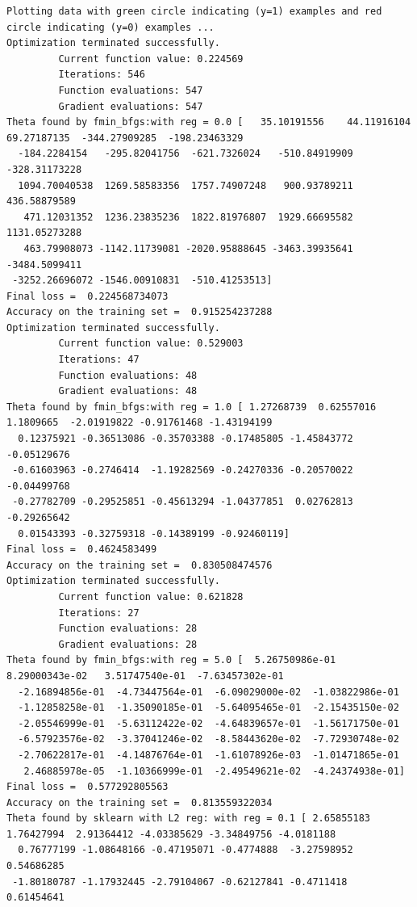 \documentclass{article}
\begin{document}
\begin{tiny}
\begin{lstlisting}
Plotting data with green circle indicating (y=1) examples and red circle indicating (y=0) examples ...
Optimization terminated successfully.
         Current function value: 0.224569
         Iterations: 546
         Function evaluations: 547
         Gradient evaluations: 547
Theta found by fmin_bfgs:with reg = 0.0 [   35.10191556    44.11916104    69.27187135  -344.27909285  -198.23463329
  -184.2284154   -295.82041756  -621.7326024   -510.84919909  -328.31173228
  1094.70040538  1269.58583356  1757.74907248   900.93789211   436.58879589
   471.12031352  1236.23835236  1822.81976807  1929.66695582  1131.05273288
   463.79908073 -1142.11739081 -2020.95888645 -3463.39935641 -3484.5099411
 -3252.26696072 -1546.00910831  -510.41253513]
Final loss =  0.224568734073
Accuracy on the training set =  0.915254237288
Optimization terminated successfully.
         Current function value: 0.529003
         Iterations: 47
         Function evaluations: 48
         Gradient evaluations: 48
Theta found by fmin_bfgs:with reg = 1.0 [ 1.27268739  0.62557016  1.1809665  -2.01919822 -0.91761468 -1.43194199
  0.12375921 -0.36513086 -0.35703388 -0.17485805 -1.45843772 -0.05129676
 -0.61603963 -0.2746414  -1.19282569 -0.24270336 -0.20570022 -0.04499768
 -0.27782709 -0.29525851 -0.45613294 -1.04377851  0.02762813 -0.29265642
  0.01543393 -0.32759318 -0.14389199 -0.92460119]
Final loss =  0.4624583499
Accuracy on the training set =  0.830508474576
Optimization terminated successfully.
         Current function value: 0.621828
         Iterations: 27
         Function evaluations: 28
         Gradient evaluations: 28
Theta found by fmin_bfgs:with reg = 5.0 [  5.26750986e-01   8.29000343e-02   3.51747540e-01  -7.63457302e-01
  -2.16894856e-01  -4.73447564e-01  -6.09029000e-02  -1.03822986e-01
  -1.12858258e-01  -1.35090185e-01  -5.64095465e-01  -2.15435150e-02
  -2.05546999e-01  -5.63112422e-02  -4.64839657e-01  -1.56171750e-01
  -6.57923576e-02  -3.37041246e-02  -8.58443620e-02  -7.72930748e-02
  -2.70622817e-01  -4.14876764e-01  -1.61078926e-03  -1.01471865e-01
   2.46885978e-05  -1.10366999e-01  -2.49549621e-02  -4.24374938e-01]
Final loss =  0.577292805563
Accuracy on the training set =  0.813559322034
Theta found by sklearn with L2 reg: with reg = 0.1 [ 2.65855183  1.76427994  2.91364412 -4.03385629 -3.34849756 -4.0181188
  0.76777199 -1.08648166 -0.47195071 -0.4774888  -3.27598952  0.54686285
 -1.80180787 -1.17932445 -2.79104067 -0.62127841 -0.4711418   0.61454641

\end{lstlisting}
\end{tiny}
\end{document}
